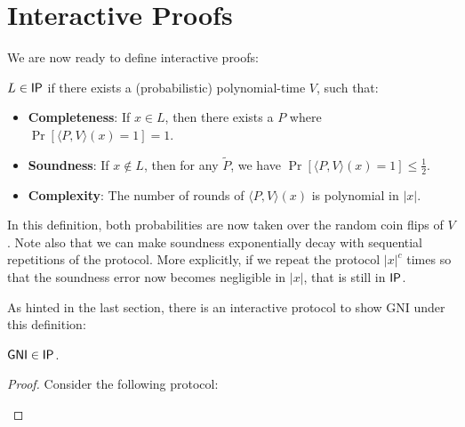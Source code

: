\documentclass{article}
\begin{document}
\section{Interactive Proofs}

We are now ready to define interactive proofs:

\begin{definition}
    $L \in \mathsf{IP}$ if there exists a (probabilistic) polynomial-time $V$, such that:
    \begin{itemize}
        \item \textbf{Completeness}: If $x \in L$, then there exists a $P$ where $\Pr[\langle P, V \rangle(x) = 1] = 1$.
        \item \textbf{Soundness}: If $x \notin L$, then for any $\tilde{P}$, we have $\Pr[\langle P, V \rangle(x) = 1] \leq \frac12$.
        \item \textbf{Complexity}: The number of rounds of $\langle P, V \rangle(x)$ is polynomial in $|x|$.
    \end{itemize}
\end{definition}

In this definition, both probabilities are now taken over the random coin flips of $V$.
Note also that we can make soundness exponentially decay with
sequential repetitions of the protocol. More explicitly, if we repeat the protocol $|x|^c$ times so that the soundness error now becomes negligible in $|x|$, that is still in $\mathsf{IP}$.

As hinted in the last section, there is an interactive protocol to show GNI under this definition:

\begin{theorem}[GMW85]
    $\textnormal{\textsf{GNI}} \in \mathsf{IP}$.
\end{theorem}
\begin{proof}
Consider the following protocol:
    \begin{center}
\end{center}

\end{proof}
\end{document}
